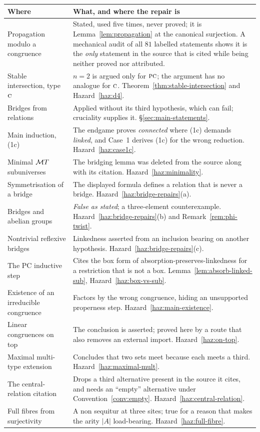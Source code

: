 \begin{center}\small
\begin{longtable}{@{}p{}p{}@{}}
\hline
\textbf{Where} & \textbf{What, and where the repair is} \\
\hline\endhead
Propagation modulo a congruence &
  Stated, used five times, never proved; it is
  Lemma~\ref{lem:propagation} at the canonical surjection.
  A mechanical audit of all $81$ labelled statements shows it is the
  \emph{only} statement in the source that is cited while being neither proved
  nor attributed. \\
Stable intersection, type $\textup{\textsc{c}}$ &
  $n=2$ is argued only for $\textup{\textsc{pc}}$; the argument has no analogue for $\textup{\textsc{c}}$.
  Theorem~\ref{thm:stable-intersection} and Hazard~\ref{haz:d4}. \\
Bridges from relations &
  Applied without its third hypothesis, which can fail; cruciality supplies it.
  \S\ref{sec:main-statements}. \\
Main induction, (1c) &
  The endgame proves \emph{connected} where (1c) demands \emph{linked}, and
  Case~1 derives (1c) for the wrong reduction. Hazard~\ref{haz:case1c}. \\
Minimal $\mathcal MT$ subuniverses &
  The bridging lemma was deleted from the source along with its citation.
  Hazard~\ref{haz:minimality}. \\
Symmetrisation of a bridge &
  The displayed formula defines a relation that is never a bridge.
  Hazard~\ref{haz:bridge-repairs}(a). \\
Bridges and abelian groups &
  \emph{False as stated}; a three-element counterexample.
  Hazard~\ref{haz:bridge-repairs}(b) and Remark~\ref{rem:phi-twist}. \\
Nontrivial reflexive bridges &
  Linkedness asserted from an inclusion bearing on another hypothesis.
  Hazard~\ref{haz:bridge-repairs}(c). \\
The PC inductive step &
  Cites the box form of absorption-preserves-linkedness for a restriction that
  is not a box. Lemma~\ref{lem:absorb-linked-sub},
  Hazard~\ref{haz:box-vs-sub}. \\
Existence of an irreducible congruence &
  Factors by the wrong congruence, hiding an unsupported properness step.
  Hazard~\ref{haz:main-existence}. \\
Linear congruences on top &
  The conclusion is asserted; proved here by a route that also removes an
  external import. Hazard~\ref{haz:on-top}. \\
Maximal multi-type extension &
  Concludes that two sets meet because each meets a third.
  Hazard~\ref{haz:maximal-mult}. \\
The central-relation citation &
  Drops a third alternative present in the source it cites, and needs an
  ``empty'' alternative under Convention~\ref{conv:empty}.
  Hazard~\ref{haz:central-relation}. \\
Full fibres from surjectivity &
  A non sequitur at three sites; true for a reason that makes the arity $|A|$
  load-bearing. Hazard~\ref{haz:full-fibre}. \\
\hline
\end{longtable}
\end{center}

